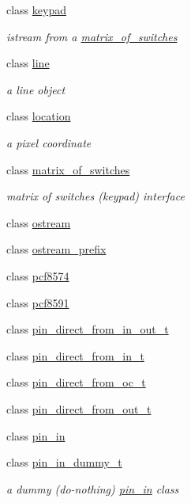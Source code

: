 \begin{DoxyCompactItemize}
\item 
class \hyperlink{classhwlib_1_1keypad}{keypad}
\begin{DoxyCompactList}\small\item\em istream from a \hyperlink{classhwlib_1_1matrix__of__switches}{matrix\+\_\+of\+\_\+switches} \end{DoxyCompactList}\item 
class \hyperlink{classhwlib_1_1line}{line}
\begin{DoxyCompactList}\small\item\em a line object \end{DoxyCompactList}\item 
class \hyperlink{classhwlib_1_1location}{location}
\begin{DoxyCompactList}\small\item\em a pixel coordinate \end{DoxyCompactList}\item 
class \hyperlink{classhwlib_1_1matrix__of__switches}{matrix\+\_\+of\+\_\+switches}
\begin{DoxyCompactList}\small\item\em matrix of switches (keypad) interface \end{DoxyCompactList}\item 
class \hyperlink{classhwlib_1_1ostream}{ostream}
\item 
class \hyperlink{classhwlib_1_1ostream__prefix}{ostream\+\_\+prefix}
\item 
class \hyperlink{classhwlib_1_1pcf8574}{pcf8574}
\item 
class \hyperlink{classhwlib_1_1pcf8591}{pcf8591}
\item 
class \hyperlink{classhwlib_1_1pin__direct__from__in__out__t}{pin\+\_\+direct\+\_\+from\+\_\+in\+\_\+out\+\_\+t}
\item 
class \hyperlink{classhwlib_1_1pin__direct__from__in__t}{pin\+\_\+direct\+\_\+from\+\_\+in\+\_\+t}
\item 
class \hyperlink{classhwlib_1_1pin__direct__from__oc__t}{pin\+\_\+direct\+\_\+from\+\_\+oc\+\_\+t}
\item 
class \hyperlink{classhwlib_1_1pin__direct__from__out__t}{pin\+\_\+direct\+\_\+from\+\_\+out\+\_\+t}
\item 
class \hyperlink{classhwlib_1_1pin__in}{pin\+\_\+in}
\item 
class \hyperlink{classhwlib_1_1pin__in__dummy__t}{pin\+\_\+in\+\_\+dummy\+\_\+t}
\begin{DoxyCompactList}\small\item\em a dummy (do-\/nothing) \hyperlink{classhwlib_1_1pin__in}{pin\+\_\+in} class \end{DoxyCompactList}\item 

\end{DoxyCompactItemize}
